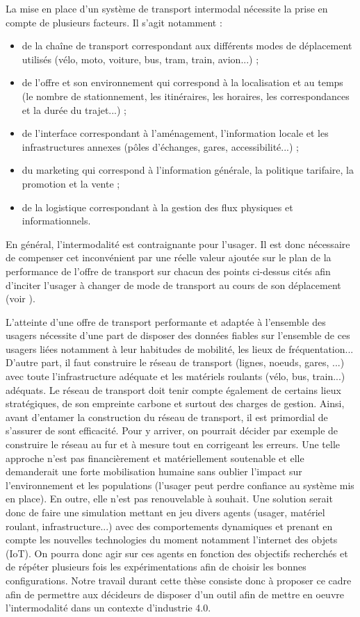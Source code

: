 La mise en place d'un système de transport intermodal nécessite la prise en compte de plusieurs facteurs. Il s'agit notamment :

\begin{itemize}
    \item de la chaîne de transport correspondant aux différents modes de déplacement utilisés (vélo, moto, voiture, bus, tram, train, avion...) ;
    \item de l'offre et son environnement qui correspond à la localisation et au temps (le nombre de stationnement, les itinéraires, les horaires, les correspondances et la durée du trajet...) ;
    \item de l'interface correspondant à l'aménagement, l'information locale et les infrastructures annexes (pôles d'échanges, gares, accessibilité...) ;
    \item du marketing qui correspond à l'information générale, la politique tarifaire, la promotion et la vente ;
    \item de la logistique correspondant à la gestion des flux physiques et informationnels.
\end{itemize}

En général, l'intermodalité est contraignante pour l'usager. Il est donc nécessaire de compenser cet inconvénient par une réelle valeur ajoutée sur le plan de la performance de l'offre de transport sur chacun des points ci-dessus cités afin d'inciter l'usager à changer de mode de transport au cours de son déplacement (voir \cite{wiki:xxx}).

L'atteinte d'une offre de transport performante et adaptée à l'ensemble des usagers nécessite d'une part de disposer des données fiables sur l'ensemble de ces usagers liées notamment à leur habitudes de mobilité, les lieux de fréquentation... D'autre part, il faut construire le réseau de transport (lignes, noeuds, gares, ...) avec toute l'infrastructure adéquate et les matériels roulants (vélo, bus, train...) adéquats. Le réseau de transport doit tenir compte également de certains lieux stratégiques, de son empreinte carbone et surtout des charges de gestion. Ainsi, avant d'entamer la construction du réseau de transport, il est primordial de s'assurer de sont efficacité. Pour y arriver, on pourrait décider par exemple de construire le réseau au fur et à mesure tout en corrigeant les erreurs. Une telle approche n'est pas financièrement et matériellement soutenable et elle demanderait une forte mobilisation humaine sans oublier l'impact sur l'environnement et les populations (l'usager peut perdre confiance au système mis en place). En outre, elle n'est pas renouvelable à souhait. Une solution serait donc de faire une simulation mettant en jeu divers agents (usager, matériel roulant, infrastructure...) avec des comportements dynamiques et prenant en compte les nouvelles technologies du moment notamment l'internet des objets (IoT). On pourra donc agir sur ces agents en fonction des objectifs recherchés et de répéter plusieurs fois les expérimentations afin de choisir les bonnes configurations. Notre travail durant cette thèse consiste donc à proposer ce cadre afin de permettre aux décideurs de disposer d'un outil afin de mettre en oeuvre l'intermodalité dans un contexte d'industrie 4.0.